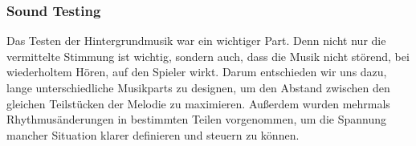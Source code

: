 \subsubsection{Sound Testing}\label{subsubsec:Sound-Testing}
Das Testen der Hintergrundmusik war ein wichtiger Part.
Denn nicht nur die vermittelte Stimmung ist wichtig, sondern auch, dass die Musik nicht störend, bei wiederholtem Hören, auf den Spieler wirkt.
Darum entschieden wir uns dazu, lange unterschiedliche Musikparts zu designen, um den Abstand zwischen den gleichen Teilstücken der Melodie zu maximieren.
Außerdem wurden mehrmals Rhythmusänderungen in bestimmten Teilen vorgenommen, um die Spannung mancher Situation klarer definieren und steuern zu können.

%

\renewcommand{\kapitelautor}{}
